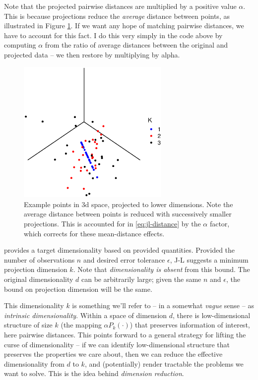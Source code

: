 \documentclass{article}
\begin{document}
Note that the projected pairwise distances are multiplied by a positive value
$\alpha$. This is because projections reduce the \emph{average} distance between
points, as illustrated in Figure \ref{fig:jl-avg-distance}. If we want any hope
of matching pairwise distances, we have to account for this fact. I do this very
simply in the code above by computing $\alpha$ from the ratio of average
distances between the original and projected data -- we then restore by
multiplying by alpha.

\begin{figure}[!ht]
  \centering
  \includegraphics[width=0.65\textwidth]{../../images/dim_proj1}
  \caption{Example points in 3d space, projected to lower dimensions. Note the
    average distance between points is reduced with successively smaller
    projections. This is accounted for in \eqref{eq:jl-distance} by the $\alpha$
    factor, which corrects for these mean-distance effects.}
  \label{fig:jl-avg-distance}
\end{figure}

 provides a target dimensionality based on provided
quantities. Provided the number of observations $n$ and desired error tolerance
$\epsilon$, J-L suggests a minimum projection dimension $k$. Note that
\emph{dimensionality is absent} from this bound. The original dimensionality $d$
can be arbitrarily large; given the same $n$ and $\epsilon$, the bound on
projection dimension will be the same.

This dimensionality $k$ is something we'll refer to -- in a somewhat
\emph{vague} sense -- as \emph{intrinsic dimensionality}. Within a space of
dimension $d$, there is low-dimensional structure of size $k$ (the mapping
$\alpha P_k(\cdot)$) that preserves information of interest, here pairwise
distances. This points forward to a general strategy for lifting the curse of
dimensionality -- if we can identify low-dimensional structure that preserves
the properties we care about, then we can reduce the effective dimensionality
from $d$ to $k$, and (potentially) render tractable the problems we want to
solve. This is the idea behind \emph{dimension reduction}.
\end{document}
